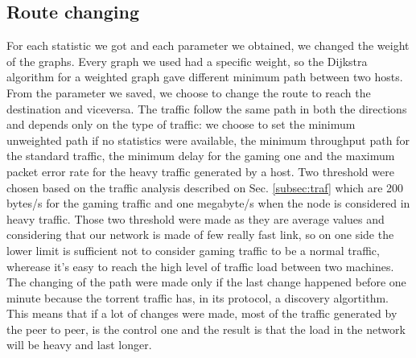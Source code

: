 \documentclass[article,10pt]{IEEEtran}
\begin{document}
\subsection{Route changing}


For each statistic we got and each parameter we obtained, we changed the weight of the graphs. Every graph we used had a specific weight, so the
Dijkstra algorithm for a weighted graph gave different minimum path between two hosts. From the parameter we saved, we choose to change the
route to reach the destination and viceversa. The traffic follow the same path in both the directions and depends only on the type of traffic:
we choose to set the minimum unweighted path if no statistics were available, the minimum throughput path for the standard traffic, the minimum
delay for the gaming one and the maximum packet error rate for the heavy traffic generated by a host.
Two threshold were chosen based on the traffic analysis described on Sec. \ref{subsec:traf} which are 200 bytes/s for the gaming traffic and one megabyte/s
when the node is considered in heavy traffic. Those two threshold were made as they are average values and considering that our network is made of few really fast link,
so on one side the lower limit is sufficient not to consider gaming traffic to be a normal traffic, wherease it's easy to reach the high level of traffic load between two machines.
The changing of the path were made only if the last change happened before one minute because the torrent traffic has, in its protocol, a discovery
algortithm. This means that if a lot of changes were made, most of the traffic generated by the peer to peer, is the control one and the result is that the
load in the network will be heavy and last longer.
\end{document}
